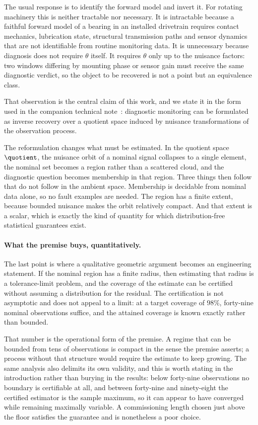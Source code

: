 The usual response is to identify the forward model and invert it. For
rotating machinery this is neither tractable nor necessary. It is intractable
because a faithful forward model of a bearing in an installed drivetrain
requires contact mechanics, lubrication state, structural transmission paths
and sensor dynamics that are not identifiable from routine monitoring data. It
is unnecessary because diagnosis does not require \(\theta\) itself. It
requires \(\theta\) only up to the nuisance factors: two windows differing by
mounting phase or sensor gain must receive the same diagnostic verdict, so
the object to be recovered is not a point but an equivalence class.

That observation is the central claim of this work, and we state it in the
form used in the companion technical note~\citep{disanti2026quotient}:
diagnostic monitoring can be formulated as inverse recovery over a quotient
space induced by nuisance transformations of the observation process.

The reformulation changes what must be estimated. In the quotient space
\(\quotient\), the nuisance orbit of a nominal signal collapses to a single
element, the nominal set becomes a region rather than a scattered cloud, and
the diagnostic question becomes membership in that region. Three things then
follow that do not follow in the ambient space. Membership is decidable from
nominal data alone, so no fault examples are needed. The region has a finite
extent, because bounded nuisance makes the orbit relatively compact. And that
extent is a scalar, which is exactly the kind of quantity for which
distribution-free statistical guarantees exist.

\paragraph{What the premise buys, quantitatively.}
The last point is where a qualitative geometric argument becomes an
engineering statement. If the nominal region has a finite radius, then
estimating that radius is a tolerance-limit problem, and the coverage of the
estimate can be certified without assuming a distribution for the residual.
The certification is not asymptotic and does not appeal to a limit: at a
target coverage of \(98\%\), forty-nine nominal observations suffice, and the
attained coverage is known exactly rather than bounded.

That number is the operational form of the premise. A regime that can be
bounded from tens of observations is compact in the sense the premise asserts;
a process without that structure would require the estimate to keep growing.
The same analysis also delimits its own validity, and this is worth stating in
the introduction rather than burying in the results: below forty-nine
observations no boundary is certifiable at all, and between forty-nine and
ninety-eight the certified estimator is the sample maximum, so it can appear
to have converged while remaining maximally variable. A commissioning length
chosen just above the floor satisfies the guarantee and is nonetheless a poor
choice.

